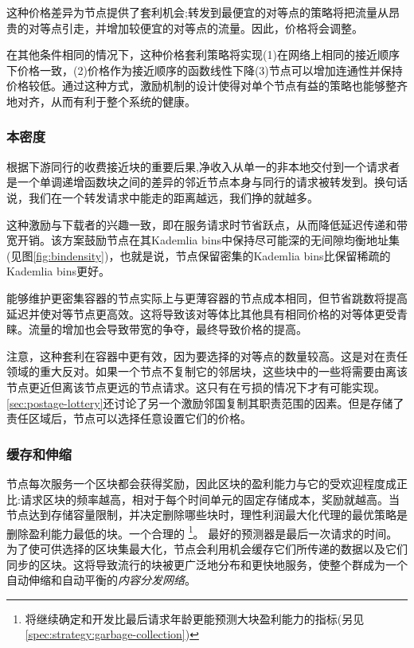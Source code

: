 这种价格差异为节点提供了套利机会;转发到最便宜的对等点的策略将把流量从昂贵的对等点引走，并增加较便宜的对等点的流量。因此，价格将会调整。 

在其他条件相同的情况下，这种价格套利策略将实现(1)在网络上相同的接近顺序下价格一致，(2)价格作为接近顺序的函数线性下降(3)节点可以增加连通性并保持价格较低。通过这种方式，激励机制的设计使得对单个节点有益的策略也能够整齐地对齐，从而有利于整个系统的健康。


\subsubsection{本密度}

根据下游同行的收费接近块的重要后果,净收入从单一的非本地交付到一个请求者是一个单调递增函数块之间的差异的邻近节点本身与同行的请求被转发到。换句话说，我们在一个转发请求中能走的距离越远，我们挣的就越多。 

这种激励与下载者的兴趣一致，即在服务请求时节省跃点，从而降低延迟传递和带宽开销。该方案鼓励节点在其Kademlia bins中保持尽可能深的无间隙均衡地址集(见图\ref{fig:bindensity})，也就是说，节点保留密集的Kademlia bins比保留稀疏的Kademlia bins更好。


能够维护更密集容器的节点实际上与更薄容器的节点成本相同，但节省跳数将提高延迟并使对等节点更高效。这将导致该对等体比其他具有相同价格的对等体更受青睐。流量的增加也会导致带宽的争夺，最终导致价格的提高。 

注意，这种套利在容器中更有效，因为要选择的对等点的数量较高。这是对在责任领域的重大反对。如果一个节点不复制它的邻居块，这些块中的一些将需要由离该节点更近但离该节点更远的节点请求。这只有在亏损的情况下才有可能实现。\ref{sec:postage-lottery}还讨论了另一个激励邻国复制其职责范围的因素。但是存储了责任区域后，节点可以选择任意设置它们的价格。 


\subsubsection{缓存和伸缩}\label{sec:caching}

节点每次服务一个区块都会获得奖励，因此区块的盈利能力与它的受欢迎程度成正比:请求区块的频率越高，相对于每个时间单元的固定存储成本，奖励就越高。当节点达到存储容量限制，并决定删除哪些块时，理性利润最大化代理的最优策略是删除盈利能力最低的块。一个合理的%
%
\footnote{将继续确定和开发比最后请求年龄更能预测大块盈利能力的指标(另见\ref{spec:strategy:garbage-collection})}。
最好的预测器是最后一次请求的时间。为了使可供选择的区块集最大化，节点会利用机会缓存它们所传递的数据以及它们同步的区块。这将导致流行的块被更广泛地分布和更快地服务，使整个群成为一个自动伸缩和自动平衡的\emph{内容分发网络}。


